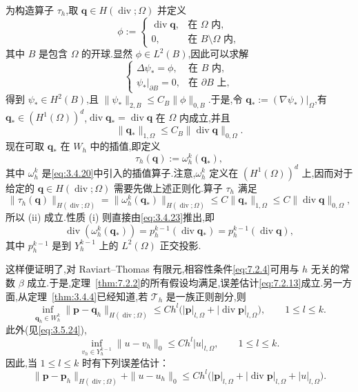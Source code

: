 为构造算子 \(\tau_h\),取 \(\boldsymbol{q}\in H(\operatorname{div};\Omega)\) 并定义
\[
  \phi:=
  \begin{cases}
    \operatorname{div}\boldsymbol{q},&\text{在 }\Omega\text{ 内},\\
    0,&\text{在 }B\setminus\Omega\text{ 内},
  \end{cases}
\]
其中 \(B\) 是包含 \(\Omega\) 的开球.显然 \(\phi\in L^2(B)\),因此可以求解
\[
  \begin{cases}
    \Delta\psi_*=\phi,&\text{在 }B\text{ 内},\\
    \psi_*|_{\partial B}=0,&\text{在 }\partial B\text{ 上},
  \end{cases}
\]
得到 \(\psi_*\in H^2(B)\),且 \(\|\psi_*\|_{2,B}\le C_B\|\phi\|_{0,B}\).于是,令 \(\boldsymbol{q}_*:=(\nabla\psi_*)|_\Omega\),有 \(\boldsymbol{q}_*\in(H^1(\Omega))^d\),\(\operatorname{div}\boldsymbol{q}_*=\operatorname{div}\boldsymbol{q}\) 在 \(\Omega\) 内成立,并且
\[
  \|\boldsymbol{q}_*\|_{1,\Omega}\le C_B\|\operatorname{div}\boldsymbol{q}\|_{0,\Omega}.
\]
现在可取 \(\boldsymbol{q}_*\) 在 \(W_h\) 中的插值,即定义
\begin{equation}\label{eq:7.2.24}
  \tau_h(\boldsymbol{q}):=\omega_h^k(\boldsymbol{q}_*),
\end{equation}
其中 \(\omega_h^k\) 是\eqref{eq:3.4.20}中引入的插值算子.注意,\(\omega_h^k\) 定义在 \((H^1(\Omega))^d\) 上,因而对于给定的 \(\boldsymbol{q}\in H(\operatorname{div};\Omega)\) 需要先做上述正则化.算子 \(\tau_h\) 满足
\[
  \|\tau_h(\boldsymbol{q})\|_{H(\operatorname{div};\Omega)}
    =\|\omega_h^k(\boldsymbol{q}_*)\|_{H(\operatorname{div};\Omega)}
    \le C\|\boldsymbol{q}_*\|_{1,\Omega}\le C\|\operatorname{div}\boldsymbol{q}\|_{0,\Omega},
\]
所以 (ii) 成立.性质 (i) 则直接由\eqref{eq:3.4.23}推出,即
\begin{equation}\label{eq:7.2.25}
  \operatorname{div}(\omega_h^k(\boldsymbol{q}_*))
    =p_h^{k-1}(\operatorname{div}\boldsymbol{q}_*)
    =p_h^{k-1}(\operatorname{div}\boldsymbol{q}),
\end{equation}
其中 \(p_h^{k-1}\) 是到 \(Y_h^{k-1}\) 上的 \(L^2(\Omega)\) 正交投影.

这样便证明了,对 Raviart--Thomas 有限元,相容性条件\eqref{eq:7.2.4}可用与 \(h\) 无关的常数 \(\beta\) 成立.于是,定理~\ref{thm:7.2.2}的所有假设均满足,误差估计\eqref{eq:7.2.13}成立.另一方面,从定理~\ref{thm:3.4.4}已经知道,若 \(\mathcal T_h\) 是一族正则剖分,则
\[
  \inf_{\boldsymbol{q}_h\in W_h^k}\|\boldsymbol{p}-\boldsymbol{q}_h\|_{H(\operatorname{div};\Omega)}
    \le Ch^l\bigl(|\boldsymbol{p}|_{l,\Omega}+|\operatorname{div}\boldsymbol{p}|_{l,\Omega}\bigr),
    \qquad 1\le l\le k.
\]
此外(见\eqref{eq:3.5.24}),
\[
  \inf_{v_h\in Y_h^{k-1}}\|u-v_h\|_0\le Ch^l|u|_{l,\Omega},\qquad 1\le l\le k.
\]
因此,当 \(1\le l\le k\) 时有下列误差估计：
\begin{equation}\label{eq:7.2.26}
  \|\boldsymbol{p}-\boldsymbol{p}_h\|_{H(\operatorname{div};\Omega)}+\|u-u_h\|_0
    \le Ch^l\bigl(|\boldsymbol{p}|_{l,\Omega}+|\operatorname{div}\boldsymbol{p}|_{l,\Omega}+|u|_{l,\Omega}\bigr).
\end{equation}

